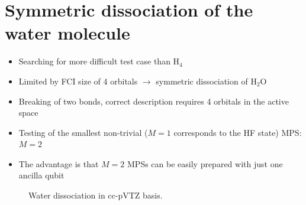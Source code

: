 \documentclass[pra,11pt]{revtex4-1}
\begin{document}
\section{Symmetric dissociation of the water molecule}

\begin{itemize}
	\item Searching for more difficult test case than H$_4$
	\item Limited by FCI size of 4 orbitals $\rightarrow$ symmetric dissociation of H$_2$O
	\item Breaking of two bonds, correct description requires 4 orbitals in the active space
	\item Testing of the smallest non-trivial ($M = 1$ corresponds to the HF state) MPS: $M = 2$ 
	\item The advantage is that $M = 2$ MPSs can be easily prepared with just one ancilla qubit
\end{itemize}

\begin{figure}[!h]
  \caption{Water dissociation in cc-pVTZ basis.}
\end{figure}
\end{document}

